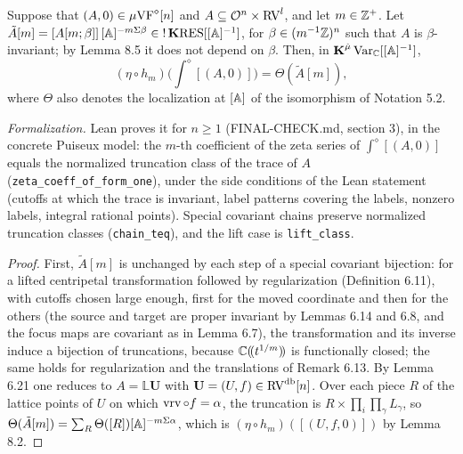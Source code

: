 \setcounter{theorem}{5}
\begin{lemma}
\label{inv-dir-com}
\leanok
{}
Suppose that $(A, 0) \in \mu\mathrm{VF}^\diamond[n]$ and $A \subseteq \mathcal O^n \times \mathrm{RV}^l$, and let $m \in \mathbb{Z}^+$. Let $\tilde A[m] = [A[m;\beta]]\,[\mathbb{A}]^{-m\Sigma\beta} \in {!\operatorname{\mathbf{K}}}\mathrm{RES}[[\mathbb{A}]^{-1}]$, for $\beta \in (m^{-1}\mathbb{Z})^n$ such that $A$ is $\beta$-invariant; by Lemma 8.5 it does not depend on $\beta$. Then, in $\operatorname{\mathbf{K}}^{\hat\mu}\mathrm{Var}_{\mathbb{C}}[[\mathbb{A}]^{-1}]$, \[ (\eta \circ h_m)\Big(\int^\diamond [(A, 0)]\Big) = \Theta(\tilde A[m]), \] where $\Theta$ also denotes the localization at $[\mathbb{A}]$ of the isomorphism of Notation 5.2.

\emph{Formalization.} Lean proves it for $n \geq 1$ (FINAL-CHECK.md, section 3), in the concrete Puiseux model: the $m$-th coefficient of the zeta series of $\int^\diamond[(A, 0)]$ equals the normalized truncation class of the trace of $A$ (\texttt{zeta\_coeff\_of\_form\_one}), under the side conditions of the Lean statement (cutoffs at which the trace is invariant, label patterns covering the labels, nonzero labels, integral rational points). Special covariant chains preserve normalized truncation classes (\texttt{chain\_teq}), and the lift case is \texttt{lift\_class}.
\end{lemma}

\begin{proof}
First, $\tilde A[m]$ is unchanged by each step of a special covariant bijection: for a lifted centripetal transformation followed by regularization (Definition 6.11), with cutoffs chosen large enough, first for the moved coordinate and then for the others (the source and target are proper invariant by Lemmas 6.14 and 6.8, and the focus maps are covariant as in Lemma 6.7), the transformation and its inverse induce a bijection of truncations, because $\mathbb{C}(\!(t^{1/m})\!)$ is functionally closed; the same holds for regularization and the translations of Remark 6.13. By Lemma 6.21 one reduces to $A = \mathbb L \mathbf U$ with $\mathbf U = (U, f) \in \mathrm{RV}^{\operatorname{db}}[n]$. Over each piece $R$ of the lattice points of $U$ on which $\operatorname{vrv} \circ f = \alpha$, the truncation is $R \times \prod_i \prod_\gamma L_\gamma$, so $\Theta(\tilde A[m]) = \sum_R \Theta([R])[\mathbb{A}]^{-m\Sigma\alpha}$, which is $(\eta \circ h_m)([(U, f, 0)])$ by Lemma 8.2.
\end{proof}

